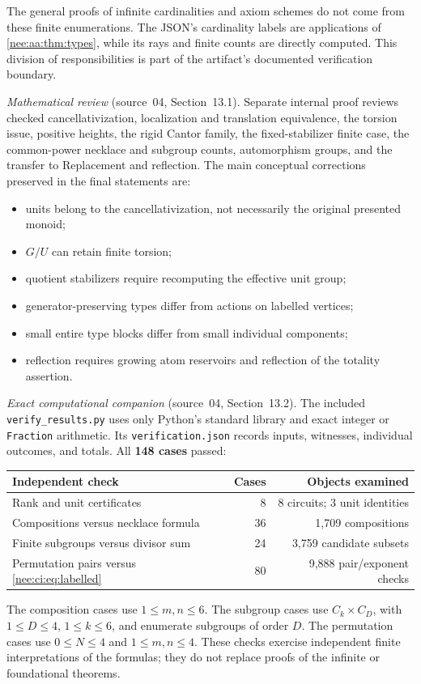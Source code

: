 \documentclass[11pt,letterpaper]{article}
\numberwithin{equation}{section}
\theoremstyle{plain}
\theoremstyle{definition}
\theoremstyle{remark}
\begin{document}
The general proofs of infinite cardinalities and axiom schemes do not come
from these finite enumerations. The JSON's cardinality labels are applications
of \cref{nee:aa:thm:types}, while its rays and finite counts are directly computed.
This division of responsibilities is part of the artifact's documented
verification boundary.

\emph{Mathematical review} (source~04, Section~13.1).
Separate internal proof reviews checked cancellativization,
localization and translation equivalence, the torsion
issue, positive heights, the rigid Cantor family,
the fixed-stabilizer finite case, the common-power
necklace and subgroup counts, automorphism groups,
and the transfer to Replacement and reflection.
The main conceptual corrections preserved in the
final statements are:
\begin{itemize}
\item units belong to the cancellativization, not
necessarily the original presented monoid;
\item $G/U$ can retain finite torsion;
\item quotient stabilizers require recomputing
the effective unit group;
\item generator-preserving types differ from
actions on labelled vertices;
\item small entire type blocks differ from
small individual components;
\item reflection requires growing atom reservoirs
and reflection of the totality assertion.
\end{itemize}

\emph{Exact computational companion} (source~04, Section~13.2).
The included \texttt{verify\_results.py} uses only
Python's standard library and exact integer or
\texttt{Fraction} arithmetic. Its \texttt{verification.json}
records inputs, witnesses, individual outcomes,
and totals. All \textbf{148 cases} passed:
\begin{center}
\begin{tabularx}{\linewidth}{Yrr}
\toprule
Independent check&Cases&Objects examined\\
\midrule
Rank and unit certificates&8&8 circuits; 3 unit identities\\
Compositions versus necklace formula&36&1,709 compositions\\
Finite subgroups versus divisor sum&24&3,759 candidate subsets\\
Permutation pairs versus \eqref{nee:ci:eq:labelled}&80&9,888 pair/exponent checks\\
\bottomrule
\end{tabularx}
\end{center}
The composition cases use $1\leq m,n\leq6$.
The subgroup cases use $C_k\times C_D$, with
$1\leq D\leq4$, $1\leq k\leq6$, and enumerate
subgroups of order $D$. The permutation cases
use $0\leq N\leq4$ and $1\leq m,n\leq4$.
These checks exercise independent finite
interpretations of the formulas; they do not
replace proofs of the infinite or foundational
theorems.
\end{document}
